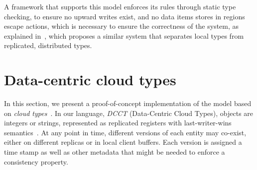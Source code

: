 \documentclass[preprint,numbers]{sigplanconf}
\begin{document}
A framework that
supports this model enforces its rules through static type checking, to ensure
no upward writes exist, and no data items stores in regions escape actions,
which is necessary to ensure the correctness of the system, as explained
in~\cite{burckhardt2012cloud}, which proposes a similar system that separates
local types from replicated, distributed types.

%


\section{Data-centric cloud types}
\label{sec:example}
In this section, we present a 
proof-of-concept implementation of the model based on \emph{cloud
types}~\cite{burckhardt2012cloud}. In our language, \emph{DCCT} (Data-Centric
Cloud Types), objects are integers or strings,
represented as replicated registers with last-writer-wins
semantics~\cite{burckhardt2014replicated}. At any point in time, different
versions of each entity may
co-exist, either on different replicas or in local client buffers. Each version
is assigned a time stamp as well as other metadata that might be needed to
enforce a consistency property.
\end{document}
